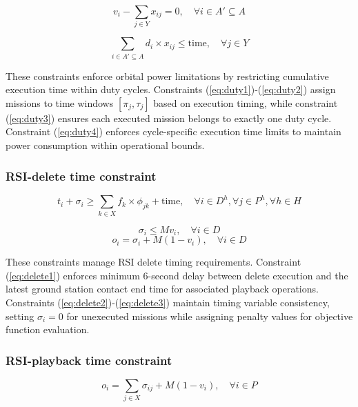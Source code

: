 \documentclass[preprint,3p,12pt,authoryear]{elsarticle}
\begin{document}
\begin{equation}
v_i - \sum_{j \in Y} x_{ij} = 0, \quad \forall i \in A' \subseteq A \label{eq:duty3}
\end{equation}

\begin{equation}
\sum_{i \in A' \subseteq A} d_i \times x_{ij} \le \text{time}, \quad \forall j \in Y \label{eq:duty4}
\end{equation}

These constraints enforce orbital power limitations by restricting cumulative execution time within duty cycles. Constraints (\ref{eq:duty1})-(\ref{eq:duty2}) assign missions to time windows $[\pi_j, \tau_j]$ based on execution timing, while constraint (\ref{eq:duty3}) ensures each executed mission belongs to exactly one duty cycle. Constraint (\ref{eq:duty4}) enforces cycle-specific execution time limits to maintain power consumption within operational bounds.

\subsubsection{RSI-delete time constraint}
\begin{equation}
t_i+\sigma_i \ge \sum_{k \in X} f_k \times \phi_{jk} + \text{time}, \quad \forall i \in D^h, \forall j \in P^h, \forall h \in H \label{eq:delete1}
\end{equation}

\begin{equation}
\sigma_i \le M v_i, \quad \forall i \in D \label{eq:delete2}
\end{equation}
\begin{equation}
o_i = \sigma_i + M(1-v_i), \quad \forall i \in D \label{eq:delete3}
\end{equation}

These constraints manage RSI delete timing requirements. Constraint (\ref{eq:delete1}) enforces minimum 6-second delay between delete execution and the latest ground station contact end time for associated playback operations. Constraints (\ref{eq:delete2})-(\ref{eq:delete3}) maintain timing variable consistency, setting $\sigma_i = 0$ for unexecuted missions while assigning penalty values for objective function evaluation.

\subsubsection{RSI-playback time constraint}
\begin{equation}
o_i = \sum_{j \in X} \sigma_{ij} + M(1-v_i), \quad \forall i \in P \label{eq:playback1}
\end{equation}
\end{document}
